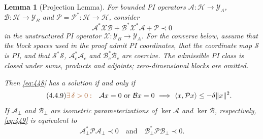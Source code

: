 \documentclass[10pt,a4paper]{article}
\newcommand{\extra}[1]{\textcolor{assumption}{#1}}
\newcommand{\op}[1]{\mathcal{#1}}
\newtheorem{lemma}{Lemma}
\begin{document}
\begin{lemma}[Projection Lemma]
For bounded PI operators $\op A:\op H\to\op Y_A$,
$\op B:\op H\to\op Y_B$ and $\op P=\op P^*:\op H\to\op H$, consider
\begin{equation}\tag{4.4.8}\label{eq:448}
 \op A^*\op X\op B+\op B^*\op X^*\op A+\op P\prec0
\end{equation}
in the unstructured PI operator $\op X:\op Y_B\to\op Y_A$.
For the converse below, assume
\extra{that the block spaces used in the proof admit PI coordinates,
that the coordinate map $\op S$ is PI, and that
$\op S^*\op S$, $\op A_c^*\op A_c$ and $\op B_c^*\op B_c$
are coercive}.
The admissible PI class is closed under sums, products and adjoints;
zero-dimensional blocks are omitted.

Then \eqref{eq:448} has a solution if and only if
\begin{equation}\tag{4.4.9}\label{eq:449}
 \extra{\exists\,\delta>0:}\quad
 \op Ax=0\text{ or }\op Bx=0
 \ \Longrightarrow\
 \langle x,\op Px\rangle\le-\delta\|x\|^2.
\end{equation}
If $\op A_\perp$ and $\op B_\perp$ are isometric parameterizations
of $\ker\op A$ and $\ker\op B$, respectively,
\eqref{eq:449} is equivalent to
\begin{equation}\tag{4.4.10}\label{eq:4410}
 \op A_\perp^*\op P\op A_\perp\prec0
 \quad\text{and}\quad
 \op B_\perp^*\op P\op B_\perp\prec0.
\end{equation}
\end{lemma}
\end{document}
